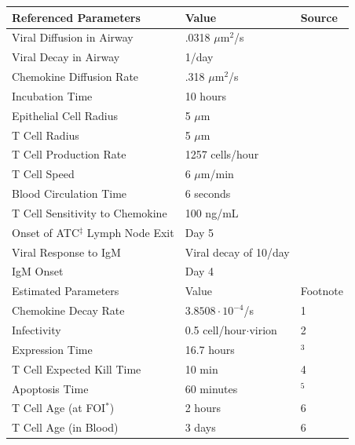 \documentclass[10pt]{article}
\begin{document}
\begin{table}[!ht]
\begin{center}
\begin{tabular}{| l l l |}
  \hline                        
  Referenced Parameters & Value & Source \\
  \hline
  Viral Diffusion in Airway & .0318 $\mu$m$^2$/s & \cite{Beauchemin2006} \\
  Viral Decay in Airway &  1/day & \cite{Lee2009} \\
  Chemokine Diffusion Rate & .318 $\mu$m$^2$/s & \cite{Beauchemin2006} \\
  Incubation Time &  10 hours & \cite{Mitchell2011} \\
  Epithelial Cell Radius & 5 $\mu$m & \cite{Elbert1999} \\
  T Cell Radius & 5 $\mu$m & \cite{abbas2011cellular} \\
  T Cell Production Rate & 1257 cells/hour & \cite{Miao2010} \\ 
  T Cell Speed & 6 $\mu$m/min & \cite{Egen2011} \\
  Blood Circulation Time & 6 seconds & \cite{Banerjee2010b} \\
  T Cell Sensitivity to Chemokine & 100 ng/mL & \cite{Nandagopal2011} \\
  Onset of ATC$^\ddagger$ Lymph Node Exit & Day 5 & \cite{Banerjee2011} \\
  Viral Response to IgM & Viral decay of 10/day & \cite{Diamond2003} \\
  IgM Onset & Day 4 & \cite{Diamond2003} \\
  \hline
  \hline                        
  Estimated Parameters & Value & Footnote \\
  \hline
  Chemokine Decay Rate & $3.8508\cdot10^{-4}$/s & 1\\
  Infectivity & 0.5 cell/hour$\cdot$virion &  2 \\
  Expression Time & 16.7 hours & \cite{Mitchell2011}$^3$ \\
  T Cell Expected Kill Time & 10 min & 4 \\
  Apoptosis Time & 60 minutes & \cite{Ganusov2008}$^5$ \\
  T Cell Age (at FOI$^\ast$) & 2 hours & 6 \\
  T Cell Age (in Blood) & 3 days & 6 \\
  \hline  
\end{tabular}

\end{center}
\end{table}
\end{document}
